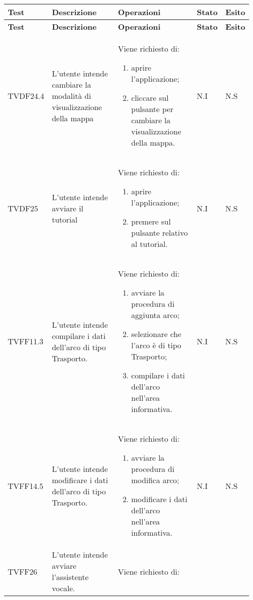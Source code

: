 \def\arraystretch{1.5}
\begin{longtable}{p{1.8cm}!{\VRule[1pt]}p{3.5cm}!{\VRule[1pt]}p{5.5cm}!{\VRule[1pt]}p{1cm}!{\VRule[1pt]}p{1cm}}
	\color{white} \textbf{Test} & \color{white} \textbf{Descrizione} & \color{white} \textbf{Operazioni} & \color{white} \textbf{Stato} & \color{white} \textbf{Esito} \\ 
	\endfirsthead 
	\color{white} \textbf{Test} & \color{white} \textbf{Descrizione} & \color{white} \textbf{Operazioni} & \color{white} \textbf{Stato} & \color{white} \textbf{Esito} \\ 
	\endhead 
	TVDF24.4 & L'utente intende cambiare la modalità di visualizzazione della mappa & Viene richiesto di: \begin{enumerate} 
		\item aprire l'applicazione; 
		\item cliccare sul pulsante per cambiare la visualizzazione della mappa. 
	\end{enumerate} & N.I & N.S \\ 
	TVDF25 & L'utente intende avviare il tutorial & Viene richiesto di: \begin{enumerate} 
		\item aprire l'applicazione; 
		\item premere sul pulsante relativo al tutorial. 
	\end{enumerate} & N.I & N.S \\ 
	TVFF11.3 & L'utente intende compilare i dati dell'arco di tipo Trasporto. & Viene richiesto di: \begin{enumerate} 
		\item avviare la procedura di aggiunta arco; 
		\item selezionare che l'arco è di tipo Trasporto; 
		\item compilare i dati dell'arco nell'area informativa. 
	\end{enumerate} & N.I & N.S \\ 
	TVFF14.5 & L'utente intende modificare i dati dell'arco di tipo Trasporto. & Viene richiesto di: \begin{enumerate} 
		\item avviare la procedura di modifica arco; 
		\item modificare i dati dell'arco nell'area informativa. 
	\end{enumerate} & N.I & N.S \\ 
	TVFF26 & L'utente intende avviare l'assistente vocale. & Viene richiesto di: \begin{enumerate} 

\end{enumerate}
\end{longtable}
